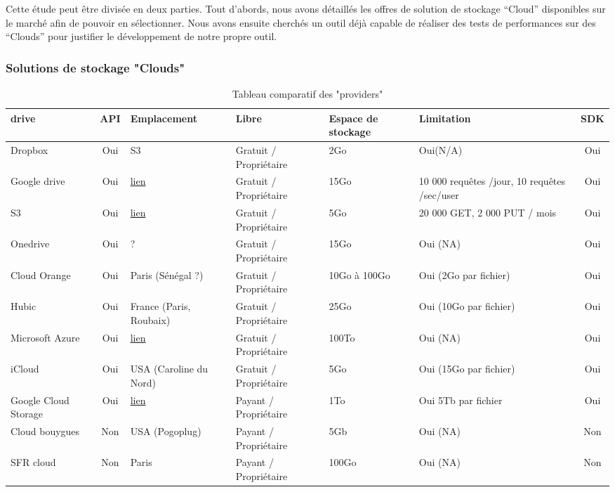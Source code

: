 \documentclass[10pt]{article}
\begin{document}
Cette étude peut être divisée en deux parties. Tout d’abords, nous avons détaillés les offres de solution de stockage “Cloud” disponibles sur le marché afin de pouvoir en sélectionner. Nous avons ensuite cherchés un outil déjà capable de réaliser des tests de performances sur des “Clouds” pour justifier le développement de notre propre outil.

\subsubsection{Solutions de stockage "Clouds"}
\begin{table}[!h]
\caption{Tableau comparatif des "providers"}
\renewcommand{\arraystretch}{1.5}
\begin{center}
\begin{tabular}{|m{1in}|c|m{1in}|m{1in}|m{1in}|m{1in}|c|}
 \hline
 \bf\centering drive & \bf API & \bf Emplacement & \bf Libre & \bf\centering Espace de stockage & \bf Limitation & \bf SDK\\
 \hline
 \centering Dropbox & Oui & S3 & Gratuit / Propriétaire & 2Go & Oui(N/A) & Oui \\
 \hline
  \centering Google drive & Oui  & \href{http://www.google.com/about/datacenters/inside/locations/index.html}{lien} & Gratuit / Propriétaire & 15Go & 10 000 requêtes /jour, 10 requêtes /sec/user & Oui \\
 \hline
  \centering S3 & Oui  &  \href{http://aws.amazon.com/fr/about-aws/global-infrastructure/}{lien} & Gratuit / Propriétaire & 5Go & 20 000 GET, 2 000 PUT / mois & Oui \\
 \hline
  \centering Onedrive & Oui  & ? & Gratuit / Propriétaire & 15Go & Oui (NA) & Oui \\
 \hline
  \centering Cloud Orange & Oui  & Paris (Sénégal ?) & Gratuit / Propriétaire & 10Go à 100Go & Oui (2Go par fichier) & Oui \\
 \hline
  \centering Hubic & Oui  & France (Paris, Roubaix) & Gratuit / Propriétaire & 25Go & Oui (10Go par fichier) & Oui \\
 \hline
  \centering Microsoft Azure & Oui  &  \href{http://azure.microsoft.com/en-us/regions/}{lien} & Gratuit / Propriétaire & 100To & Oui (NA) & Oui \\
 \hline
  \centering iCloud & Oui  & USA (Caroline du Nord) & Gratuit / Propriétaire & 5Go & Oui (15Go par fichier) & Oui \\
 \hline
  \centering Google Cloud Storage & Oui  &  \href{http://www.google.com/about/datacenters/inside/locations/index.html}{lien}  & Payant  / Propriétaire & 1To & Oui 5Tb par fichier & Oui \\
 \hline
  \centering Cloud bouygues & Non  & USA (Pogoplug) & Payant  / Propriétaire & 5Gb & Oui (NA) & Non \\
 \hline
  \centering SFR cloud & Non & Paris & Payant / Propriétaire & 100Go & Oui (NA) & Non \\
 \hline
\end{tabular}
\end{center}
\end{table}
\end{document}
